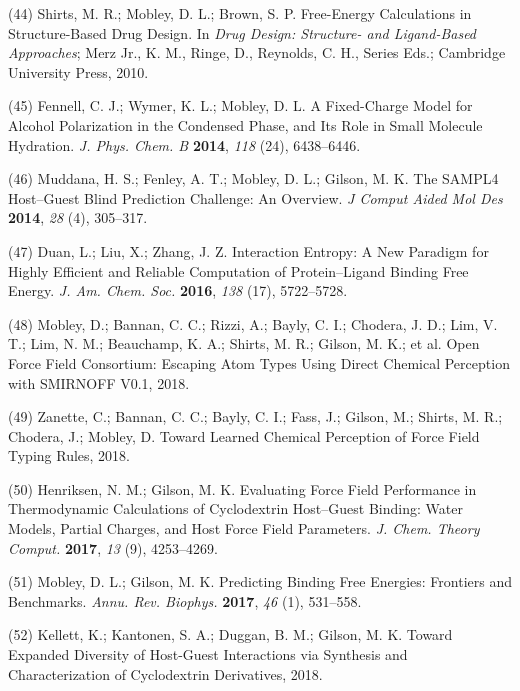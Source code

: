 \documentclass[11pt,notitlepage]{article}
\begin{document}
\leavevmode\hypertarget{ref-fC0t6Cy1}{}%
(44) Shirts, M. R.; Mobley, D. L.; Brown, S. P. Free-Energy Calculations
in Structure-Based Drug Design. In \emph{Drug Design: Structure- and
Ligand-Based Approaches}; Merz Jr., K. M., Ringe, D., Reynolds, C. H.,
Series Eds.; Cambridge University Press, 2010.

\leavevmode\hypertarget{ref-LOjcxYqt}{}%
(45) Fennell, C. J.; Wymer, K. L.; Mobley, D. L. A Fixed-Charge Model
for Alcohol Polarization in the Condensed Phase, and Its Role in Small
Molecule Hydration. \emph{J. Phys. Chem. B} \textbf{2014}, \emph{118}
(24), 6438--6446.

\leavevmode\hypertarget{ref-GA1AFcUw}{}%
(46) Muddana, H. S.; Fenley, A. T.; Mobley, D. L.; Gilson, M. K. The
SAMPL4 Host--Guest Blind Prediction Challenge: An Overview. \emph{J
Comput Aided Mol Des} \textbf{2014}, \emph{28} (4), 305--317.

\leavevmode\hypertarget{ref-gRfhPG7N}{}%
(47) Duan, L.; Liu, X.; Zhang, J. Z. Interaction Entropy: A New Paradigm
for Highly Efficient and Reliable Computation of Protein--Ligand Binding
Free Energy. \emph{J. Am. Chem. Soc.} \textbf{2016}, \emph{138} (17),
5722--5728.

\leavevmode\hypertarget{ref-HlBr7NrU}{}%
(48) Mobley, D.; Bannan, C. C.; Rizzi, A.; Bayly, C. I.; Chodera, J. D.;
Lim, V. T.; Lim, N. M.; Beauchamp, K. A.; Shirts, M. R.; Gilson, M. K.;
et al. Open Force Field Consortium: Escaping Atom Types Using Direct
Chemical Perception with SMIRNOFF V0.1, 2018.

\leavevmode\hypertarget{ref-13lTSBgHy}{}%
(49) Zanette, C.; Bannan, C. C.; Bayly, C. I.; Fass, J.; Gilson, M.;
Shirts, M. R.; Chodera, J.; Mobley, D. Toward Learned Chemical
Perception of Force Field Typing Rules, 2018.

\leavevmode\hypertarget{ref-HVgz5rZq}{}%
(50) Henriksen, N. M.; Gilson, M. K. Evaluating Force Field Performance
in Thermodynamic Calculations of Cyclodextrin Host--Guest Binding: Water
Models, Partial Charges, and Host Force Field Parameters. \emph{J. Chem.
Theory Comput.} \textbf{2017}, \emph{13} (9), 4253--4269.

\leavevmode\hypertarget{ref-12BD3oHp4}{}%
(51) Mobley, D. L.; Gilson, M. K. Predicting Binding Free Energies:
Frontiers and Benchmarks. \emph{Annu. Rev. Biophys.} \textbf{2017},
\emph{46} (1), 531--558.

\leavevmode\hypertarget{ref-13gqBX78S}{}%
(52) Kellett, K.; Kantonen, S. A.; Duggan, B. M.; Gilson, M. K. Toward
Expanded Diversity of Host-Guest Interactions via Synthesis and
Characterization of Cyclodextrin Derivatives, 2018.
\end{document}
